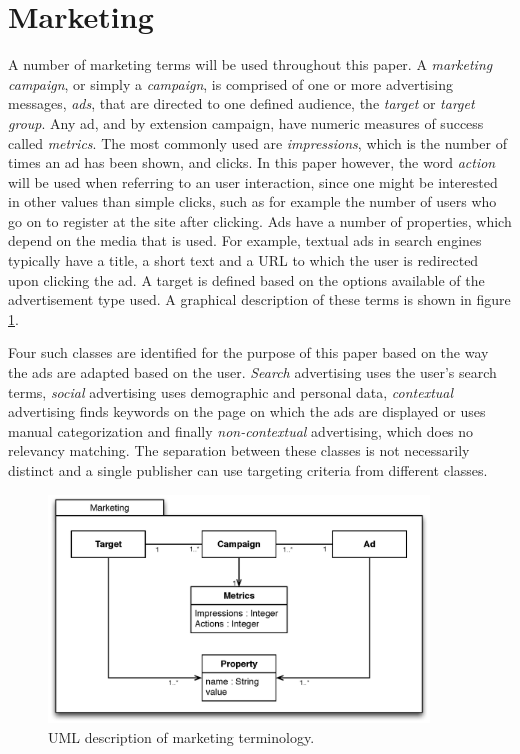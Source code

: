 \documentclass[11pt,a4paper]{report}
\begin{document}
\section{Marketing}
A number of marketing terms will be used throughout this paper. A \emph{marketing campaign}, or simply a \emph{campaign}, is comprised of one or more advertising messages, \emph{ads}, that are directed to one defined audience, the \emph{target} or \emph{target group}. Any ad, and by extension campaign, have numeric measures of success called \emph{metrics}. The most commonly used are \emph{impressions}, which is the number of times an ad has been shown, and clicks. In this paper however, the word \emph{action} will be used when referring to an user interaction, since one might be interested in other values than simple clicks, such as for example the number of users who go on to register at the site after clicking. Ads have a number of properties, which depend on the media that is used. For example, textual ads in search engines typically have a title, a short text and a URL to which the user is redirected upon clicking the ad. A target is defined based on the options available of the advertisement type used. A graphical description of these terms is shown in figure \ref{fig:MarketingTerminology}.

Four such classes are identified for the purpose of this paper based on the way the ads are adapted based on the user. \emph{Search} advertising uses the user's search terms, \emph{social} advertising uses demographic and personal data, \emph{contextual} advertising finds keywords on the page on which the ads are displayed or uses manual categorization and finally \emph{non-contextual} advertising, which does no relevancy matching. The separation between these classes is not necessarily distinct and a single publisher can use targeting criteria from different classes.

\begin{figure}[htb] \centering \includegraphics[width=0.9\textwidth]{marketing-uml.eps}
	\caption{UML description of marketing terminology.}
	\label{fig:MarketingTerminology}
\end{figure}
\end{document}
